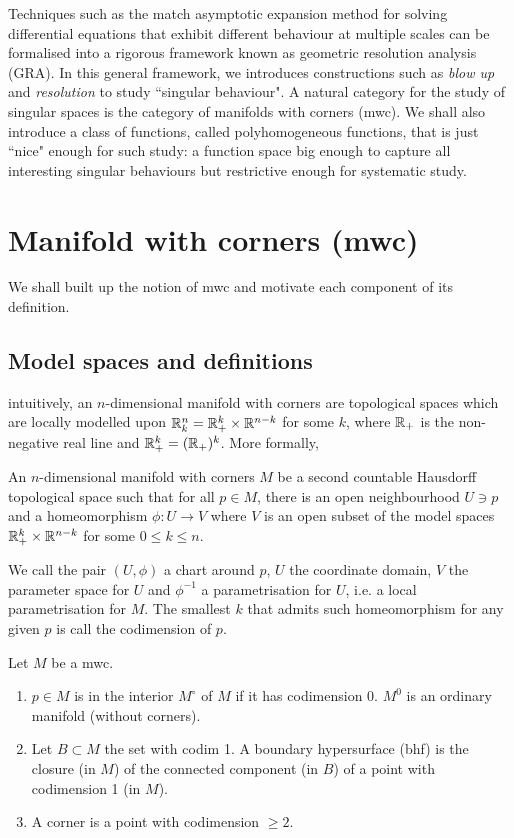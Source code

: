 \documentclass{article}
\title{}
\date{}
\begin{document}
Techniques such as the match asymptotic expansion method for solving differential equations that exhibit different behaviour at multiple scales can be formalised into a rigorous framework known as geometric resolution analysis (GRA). In this general framework, we introduces constructions such as \emph{blow up} and \emph{resolution} to study ``singular behaviour". A natural category for the study of singular spaces is the category of manifolds with corners (mwc). We shall also introduce a class of functions, called polyhomogeneous functions, that is just ``nice" enough for such study: a function space big enough to capture all interesting singular behaviours but restrictive enough for systematic study. 


\section{Manifold with corners (mwc)}
We shall built up the notion of mwc and motivate each component of its definition. 
\subsection{Model spaces and definitions}
intuitively, an $n$-dimensional manifold with corners are topological spaces which are locally modelled upon ${\mathbb R}^n_k = {\mathbb R}^k_+ \times {\ensuremath {\mathbb R}}^{n - k}$ for some $k$, where ${\mathbb R}_+$ is the non-negative real line and ${\mathbb R}^k_+ = ({\mathbb R}_+)^k$. More formally, 

\begin{fdefinition}[$t$-manifold]
An $n$-dimensional manifold with corners $M$ be a second countable Hausdorff topological space such that for all $p \in M$, there is an open neighbourhood $U \ni p$ and a homeomorphism $\phi: U \to V$ where $V$ is an open subset of the model spaces $ {\mathbb R}^k_+ \times {\ensuremath {\mathbb R}}^{n - k}$ for some $0 \leq k \leq n$. 
\end{fdefinition}

We call the pair $(U, \phi)$ a chart around $p$, $U$ the coordinate domain, $V$ the parameter space for $U$ and $\phi^{-1}$ a parametrisation for $U$, i.e. a local parametrisation for $M$. The smallest $k$ that admits such homeomorphism for any given $p$ is call the codimension of $p$. 
\begin{fdefinition} 
Let $M$ be a mwc. 
\begin{enumerate}
\item $p \in M$ is in the interior $M^\circ$ of $M$ if it has codimension 0. $M^0$ is an ordinary manifold (without corners).
\item Let $B \subset M$ the set with codim 1. A boundary hypersurface (bhf) is the closure (in $M$) of the connected component (in $B$) of a point with codimension 1 (in $M$). 
\item A corner is a point with codimension $\geq 2$. 
\end{enumerate}
\end{fdefinition}
\end{document}
